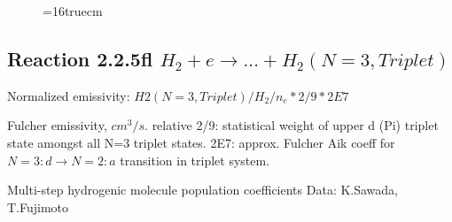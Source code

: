 \documentclass[12pt,dvipdfmx]{article}
\begin{document}
\begin{figure} \label{2.2.5e}
\epsfxsize=16truecm
\end{figure}

\newpage
\subsection{
Reaction 2.2.5fl $H_2 + e \rightarrow ...+ H_2(N=3,Triplet)$}

Normalized emissivity: $H2(N=3, Triplet)/H_2/n_e*2/9* 2E7 $

 Fulcher emissivity, $cm^3/s$. relative 2/9: statistical weight of upper d (Pi) triplet state
amongst all N=3 triplet states.
2E7: approx. Fulcher Aik coeff for $N=3: d \rightarrow N=2: a$ transition in triplet system.

 Multi-step hydrogenic molecule population coefficients
 Data: K.Sawada, T.Fujimoto \cite{kn:Sawada}
\end{document}
